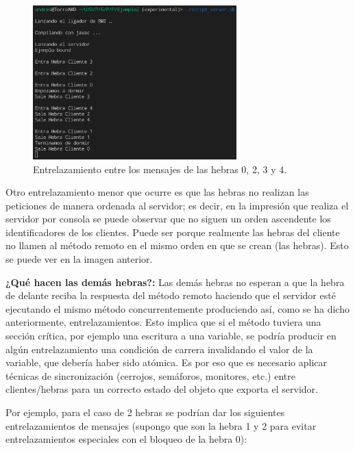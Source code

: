 \documentclass{article}
\begin{document}
\begin{figure}[H]
    \centering
    \includegraphics[width=0.7\textwidth]{imagenes/E2Server2.png}
    \caption{Entrelazamiento entre los mensajes de las hebras 0, 2, 3 y 4.}
\end{figure}

Otro entrelazamiento menor que ocurre es que las hebras no realizan las peticiones de manera ordenada al servidor; es decir, en la impresión que realiza el servidor por consola se puede observar que no siguen un orden ascendente los identificadores de los clientes. Puede ser porque realmente las hebras del cliente no llamen al método remoto en el mismo orden en que se crean (las hebras). Esto se puede ver en la imagen anterior.

\bigskip

\textbf{¿Qué hacen las demás hebras?: }Las demás hebras no esperan a que la hebra de delante reciba la respuesta del método remoto haciendo que el servidor esté ejecutando el mismo método concurrentemente produciendo así, como se ha dicho anteriormente, entrelazamientos.  
Esto implica que si el método tuviera una sección crítica, por ejemplo una escritura a una variable, se podría producir en algún entrelazamiento una condición de carrera invalidando el valor de la variable, que debería haber sido atómica. Es por eso que es necesario aplicar técnicas de sincronización (cerrojos, semáforos, monitores, etc.) entre clientes/hebras para un correcto estado del objeto que exporta el servidor.

Por ejemplo, para el caso de 2 hebras se podrían dar los siguientes entrelazamientos de mensajes (supongo que son la hebra 1 y 2 para evitar entrelazamientos especiales con el bloqueo de la hebra 0):
\end{document}
